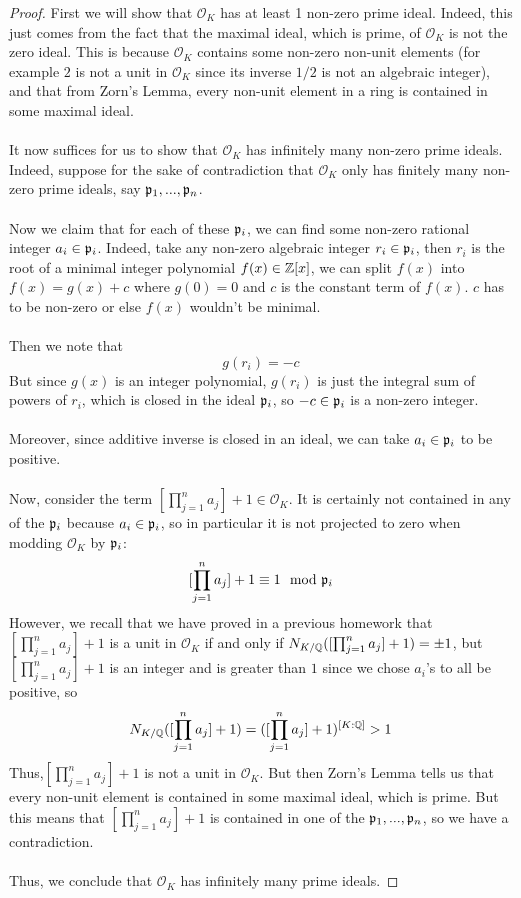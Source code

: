\begin{proof}
First we will show that $\mathcal{O}_K$ has at least 1 non-zero prime ideal. Indeed, this just comes from the fact that the maximal ideal, which is prime, of $\mathcal{O}_K$ is not the zero ideal. This is because $\mathcal{O}_K$ contains some non-zero non-unit elements (for example $2$ is not a unit in $\mathcal{O}_K$ since its inverse $1/2$ is not an algebraic integer), and that from Zorn's Lemma, every non-unit element in a ring is contained in some maximal ideal.\\\\
It now suffices for us to show that $\mathcal{O}_K$ has infinitely many non-zero prime ideals. Indeed, suppose for the sake of contradiction that $\mathcal{O}_K$ only has finitely many non-zero prime ideals, say $\mathfrak{p}_1, ..., \mathfrak{p}_n$.\\\\
Now we claim that for each of these $\mathfrak{p}_i$, we can find some non-zero rational integer $a_i \in \mathfrak{p}_i$. Indeed, take any non-zero algebraic integer $r_i \in \mathfrak{p}_i$, then $r_i$ is the root of a minimal integer polynomial $f(x) \in \mathbb{Z}[x]$, we can split $f(x)$ into $f(x) = g(x) + c$ where $g(0) = 0$ and $c$ is the constant term of $f(x)$. $c$ has to be non-zero or else $f(x)$ wouldn't be minimal.\\\\
Then we note that
\[g(r_i) = -c\]
But since $g(x)$ is an integer polynomial, $g(r_i)$ is just the integral sum of powers of $r_i$, which is closed in the ideal $\mathfrak{p}_i$, so $-c \in \mathfrak{p}_i$ is a non-zero integer.\\\\
Moreover, since additive inverse is closed in an ideal, we can take $a_i \in \mathfrak{p}_i$ to be positive.\\\\
Now, consider the term $[\prod_{j = 1}^n a_j] + 1 \in \mathcal{O}_K$. It is certainly not contained in any of the $\mathfrak{p}_i$ because $a_i \in \mathfrak{p}_i$, so in particular it is not projected to zero when modding $\mathcal{O}_K$ by $\mathfrak{p}_i$:
\[[\prod_{j = 1}^n a_j] + 1 \equiv 1 \mod {\mathfrak{p}}_i\]
However, we recall that we have proved in a previous homework that $[\prod_{j = 1}^n a_j] + 1$ is a unit in $\mathcal{O}_K$ if and only if $N_{K/\mathbb{Q}}([\prod_{j = 1}^n a_j] + 1) = \pm 1$, but $[\prod_{j = 1}^n a_j] + 1$ is an integer and is greater than $1$ since we chose $a_i$'s to all be positive, so
\[N_{K/\mathbb{Q}}([\prod_{j = 1}^n a_j] + 1) =  ([\prod_{j = 1}^n a_j] + 1)^{[K:\mathbb{Q}]} > 1\]
Thus,$[\prod_{j = 1}^n a_j] + 1$ is not a unit in $\mathcal{O}_K$. But then Zorn's Lemma tells us that every non-unit element is contained in some maximal ideal, which is prime. But this means that $[\prod_{j = 1}^n a_j] + 1$ is contained in one of the $\mathfrak{p}_1, ..., \mathfrak{p}_n$, so we have a contradiction.\\\\
Thus, we conclude that $\mathcal{O}_K$ has infinitely many prime ideals.
\end{proof}
